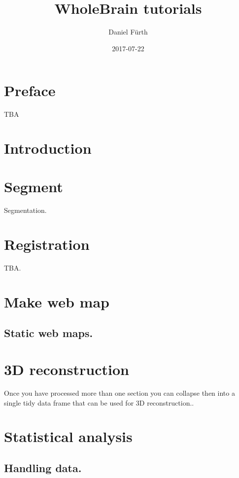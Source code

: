 \documentclass[]{book}
\title{WholeBrain tutorials}
\author{Daniel Fürth}
\date{2017-07-22}
\theoremstyle{definition}
\theoremstyle{definition}
\theoremstyle{remark}
\begin{document}
\maketitle

{
\setcounter{tocdepth}{1}
\tableofcontents
}
\chapter{Preface}\label{preface}

TBA

\chapter{Introduction}\label{intro}

\chapter{Segment}\label{segment}

Segmentation.

\chapter{Registration}\label{registration}

TBA.

\chapter{Make web map}\label{make-web-map}

\section{Static web maps.}\label{static-web-maps.}

\chapter{3D reconstruction}\label{d-reconstruction}

Once you have processed more than one section you can collapse then into
a single tidy data frame that can be used for 3D reconstruction..

\chapter{Statistical analysis}\label{statistical-analysis}

\section{Handling data.}\label{handling-data.}
\end{document}
